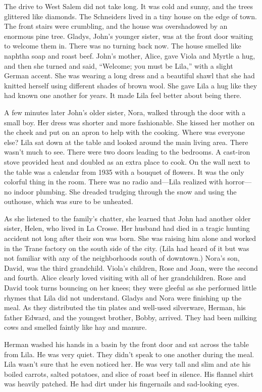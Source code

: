 \documentclass[
  letterpaper,
]{book}
\begin{document}
The drive to West Salem did not take long. It was cold and sunny, and
the trees glittered like diamonds. The Schneiders lived in a tiny house
on the edge of town. The front stairs were crumbling, and the house was
overshadowed by an enormous pine tree. Gladys, John's younger sister,
was at the front door waiting to welcome them in. There was no turning
back now. The house smelled like naphtha soap and roast beef. John's
mother, Alice, gave Viola and Myrtle a hug, and then she turned and
said, ``Welcome; you must be Lila,'' with a slight German accent. She
was wearing a long dress and a beautiful shawl that she had knitted
herself using different shades of brown wool. She gave Lila a hug like
they had known one another for years. It made Lila feel better about
being there.

A few minutes later John's older sister, Nora, walked through the door
with a small boy. Her dress was shorter and more fashionable. She kissed
her mother on the cheek and put on an apron to help with the cooking.
Where was everyone else? Lila sat down at the table and looked around
the main living area. There wasn't much to see. There were two doors
leading to the bedrooms. A cast-iron stove provided heat and doubled as
an extra place to cook. On the wall next to the table was a calendar
from 1935 with a bouquet of flowers. It was the only colorful thing in
the room. There was no radio and---Lila realized with horror---no indoor
plumbing. She dreaded trudging through the snow and using the outhouse,
which was sure to be unheated.

As she listened to the family's chatter, she learned that John had
another older sister, Helen, who lived in La Crosse. Her husband had
died in a tragic hunting accident not long after their son was born. She
was raising him alone and worked in the Trane factory on the south side
of the city. (Lila had heard of it but was not familiar with any of the
neighborhoods south of downtown.) Nora's son, David, was the third
grandchild. Viola's children, Rose and Joan, were the second and fourth.
Alice clearly loved visiting with all of her grandchildren. Rose and
David took turns bouncing on her knees; they were gleeful as she
performed little rhymes that Lila did not understand. Gladys and Nora
were finishing up the meal. As they distributed the tin plates and
well-used silverware, Herman, his father Edward, and the youngest
brother, Bobby, arrived. They had been milking cows and smelled faintly
like hay and manure.

Herman washed his hands in a basin by the front door and sat across the
table from Lila. He was very quiet. They didn't speak to one another
during the meal. Lila wasn't sure that he even noticed her. He was very
tall and slim and ate his boiled carrots, salted potatoes, and slice of
roast beef in silence. His flannel shirt was heavily patched. He had
dirt under his fingernails and sad-looking eyes.
\end{document}
